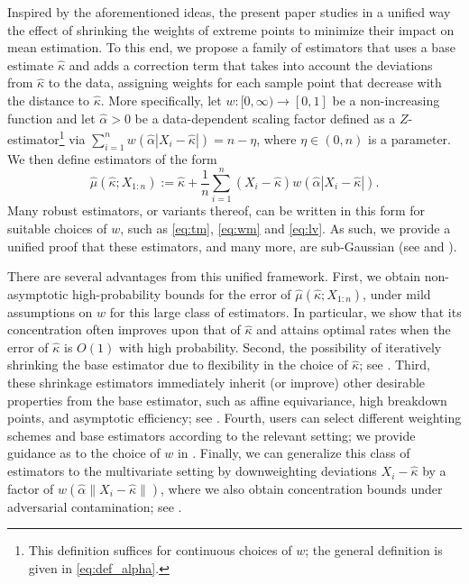 \documentclass{article}
\theoremstyle{plain}
\theoremstyle{definition}
\begin{document}
Inspired by the aforementioned ideas, the present paper studies in a unified way the effect of shrinking the weights of extreme points to minimize their impact on mean estimation. To this end, we propose a family of estimators that uses a base estimate \( \widehat{\kappa }  \) and adds a correction term that takes into account the deviations from \( \widehat{\kappa }  \) to the data, assigning weights for each sample point that decrease with the distance to \(\widehat{\kappa } \). More specifically, let $w:[0, \infty) \to [0, 1]$ be a non-increasing function and let $\widehat{\alpha} > 0$ be a data-dependent scaling factor defined as a $Z$-estimator\footnote{This definition suffices for continuous choices of $w$; the general definition is given in \eqref{eq:def_alpha}.} via $\sum_{i=1}^n w(\widehat{\alpha}|X_i - \widehat{\kappa}|) = n - \eta$, where $\eta \in (0, n)$ is a parameter. We then define estimators of the form
\begin{equation}
	\label{eq:def_estimator-intro}
  \widehat{\mu }(\widehat{\kappa };X_{1:n} ) :=\widehat{\kappa} + \frac{1}{n}\sum_{i=1}^n(X_i - \widehat{\kappa})w(\widehat{\alpha}|X_i-\widehat{\kappa}|).
\end{equation}
Many robust estimators, or variants thereof, can be written in this form for suitable choices of $w$, such as \eqref{eq:tm}, \eqref{eq:wm} and \eqref{eq:lv}. As such, we provide a unified proof that these estimators, and many more, are sub-Gaussian (see  and ). 


There are several advantages from this unified framework. First, we obtain non-asymptotic high-probability bounds for the error of \( \widehat{\mu }(\widehat{\kappa }; X_{1:n} )  \), under mild assumptions on \( w \) for this large class of estimators. In particular, we show that its concentration often improves upon that of \( \widehat{\kappa} \) and attains optimal rates when the error of \( \widehat{\kappa} \) is \( O(1) \) with high probability. Second, the possibility of iteratively shrinking the base estimator due to flexibility in the choice of \( \widehat{\kappa }  \); see . Third, these shrinkage estimators immediately inherit (or improve) other desirable properties from the base estimator, such as affine equivariance, high breakdown points, and asymptotic efficiency; see . Fourth, users can select different weighting schemes and base estimators according to the relevant setting; we provide guidance as to the choice of $w$ in . Finally, we can generalize this class of estimators to the multivariate setting by downweighting deviations \( X_i -\widehat{\kappa }  \) by a factor of \( w(\widehat{\alpha } \lVert X_i - \widehat{\kappa } \rVert ) \), where we also obtain concentration bounds under adversarial contamination; see .
\end{document}
